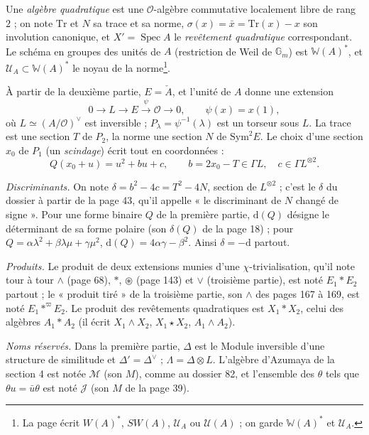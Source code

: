 \documentclass[11pt,a4paper]{article}
\begin{document}
Une \emph{algèbre quadratique} est une $\mathcal{O}$-algèbre commutative
localement libre de rang $2$ ; on note $\mathrm{Tr}$ et $N$ sa trace et sa norme,
$\sigma(x) = \bar{x} = \mathrm{Tr}(x) - x$ son involution canonique, et
$X' = \operatorname{Spec} A$ le \emph{revêtement quadratique} correspondant. Le
schéma en groupes des unités de $A$ (restriction de Weil de $\mathbb{G}_m$) est
$\mathbb{W}(A)^{*}$, et $\mathcal{U}_A \subset \mathbb{W}(A)^{*}$ le noyau de la
norme\footnote{La page écrit $W(A)^{*}$, $SW(A)$, $\mathcal{U}_A$ ou
$\mathcal{U}(A)$ ; on garde $\mathbb{W}(A)^{*}$ et $\mathcal{U}_A$.}.

À partir de la deuxième partie, $E = \check{A}$, et l'unité de $A$ donne une
extension
\[
  0 \to L \to E \xrightarrow{\ \psi\ } \mathcal{O} \to 0, \qquad \psi(x) = x(1),
\]
où $L \simeq (A/\mathcal{O})^{\vee}$ est inversible ; $P_\lambda = \psi^{-1}(\lambda)$
est un torseur sous $L$. La trace est une section $T$ de $P_2$, la norme une
section $N$ de $\mathrm{Sym}^{2}E$. Le choix d'une section $x_0$ de $P_1$ (un
\emph{scindage}) écrit tout en coordonnées :
\[
  Q(x_0 + u) = u^{2} + bu + c, \qquad b = 2x_0 - T \in \Gamma L, \quad c \in \Gamma L^{\otimes 2}.
\]

\emph{Discriminants.} On note $\delta = b^{2} - 4c = T^{2} - 4N$, section de
$L^{\otimes 2}$ ; c'est le $\delta$ du dossier à partir de la page 43, qu'il
appelle « le discriminant de $N$ changé de signe ». Pour une forme binaire $Q$ de
la première partie, $\mathrm{d}(Q)$ désigne le déterminant de sa forme polaire
(son $\delta(Q)$ de la page 18) ; pour $Q = \alpha\lambda^{2} + \beta\lambda\mu +
\gamma\mu^{2}$, $\mathrm{d}(Q) = 4\alpha\gamma - \beta^{2}$. Ainsi
$\delta = -\mathrm{d}$ partout.

\emph{Produits.} Le produit de deux extensions munies d'une
$\chi$-trivialisation, qu'il note tour à tour $\wedge$ (page 68), $*$, $\circledast$
(page 143) et $\vee$ (troisième partie), est noté $E_1 * E_2$ partout ; le
« produit tiré » de la troisième partie, son $\wedge$ des pages 167 à 169, est
noté $E_1 *^{\varpi} E_2$. Le produit des revêtements quadratiques est
$X_1 * X_2$, celui des algèbres $A_1 * A_2$ (il écrit $X_1 \wedge X_2$,
$X_1 \star X_2$, $A_1 \wedge A_2$).

\emph{Noms réservés.} Dans la première partie, $\Delta$ est le Module inversible
d'une structure de similitude et $\Delta' = \Delta^{\vee}$ ; $\Lambda = \Delta \otimes L$.
L'algèbre d'Azumaya de la section 4 est notée $\mathcal{M}$ (son $M$), comme au
dossier 82, et l'ensemble des $\theta$ tels que $\theta u = \bar{u}\theta$ est noté
$\mathcal{J}$ (son $M$ de la page 39).
\end{document}
